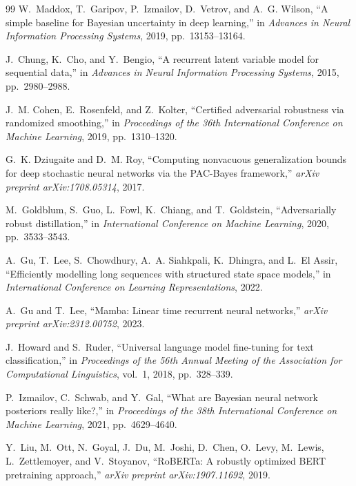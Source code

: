 \documentclass[12pt,a4paper]{article}
\theoremstyle{definition}
\begin{document}
\begin{thebibliography}{99}
W.~Maddox, T.~Garipov, P.~Izmailov, D.~Vetrov, and A.~G. Wilson, ``A simple baseline for Bayesian uncertainty in deep learning,'' in \emph{Advances in Neural Information Processing Systems}, 2019, pp.~13153--13164.

J.~Chung, K.~Cho, and Y.~Bengio, ``A recurrent latent variable model for sequential data,'' in \emph{Advances in Neural Information Processing Systems}, 2015, pp.~2980--2988.

J.~M. Cohen, E.~Rosenfeld, and Z.~Kolter, ``Certified adversarial robustness via randomized smoothing,'' in \emph{Proceedings of the 36th International Conference on Machine Learning}, 2019, pp.~1310--1320.

G.~K. Dziugaite and D.~M. Roy, ``Computing nonvacuous generalization bounds for deep stochastic neural networks via the PAC-Bayes framework,'' \emph{arXiv preprint arXiv:1708.05314}, 2017.

M.~Goldblum, S.~Guo, L.~Fowl, K.~Chiang, and T.~Goldstein, ``Adversarially robust distillation,'' in \emph{International Conference on Machine Learning}, 2020, pp.~3533--3543.

A.~Gu, T.~Lee, S.~Chowdhury, A.~A. Siahkpali, K.~Dhingra, and L.~El Assir, ``Efficiently modelling long sequences with structured state space models,'' in \emph{International Conference on Learning Representations}, 2022.

A.~Gu and T.~Lee, ``Mamba: Linear time recurrent neural networks,'' \emph{arXiv preprint arXiv:2312.00752}, 2023.

J.~Howard and S.~Ruder, ``Universal language model fine-tuning for text classification,'' in \emph{Proceedings of the 56th Annual Meeting of the Association for Computational Linguistics}, vol.~1, 2018, pp.~328--339.

P.~Izmailov, C.~Schwab, and Y.~Gal, ``What are Bayesian neural network posteriors really like?,'' in \emph{Proceedings of the 38th International Conference on Machine Learning}, 2021, pp.~4629--4640.

Y.~Liu, M.~Ott, N.~Goyal, J.~Du, M.~Joshi, D.~Chen, O.~Levy, M.~Lewis, L.~Zettlemoyer, and V.~Stoyanov, ``RoBERTa: A robustly optimized BERT pretraining approach,'' \emph{arXiv preprint arXiv:1907.11692}, 2019.


\end{thebibliography}
\end{document}
